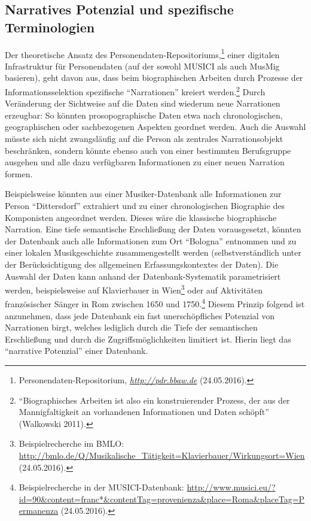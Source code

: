 \documentclass[a4paper,
fontsize=11pt,
oneside,
numbers=noperiodatend,
parskip=half-,
bibliography=totoc,
final
]{scrartcl}
\begin{document}
\subsection*{Narratives Potenzial und spezifische
Terminologien}\label{narratives-potenzial-und-spezifische-terminologien}

Der theoretische Ansatz des Personendaten-Repositoriums,\footnote{Personendaten-Repositorium,
  \href{http://pdr.bbaw.de/}{\emph{http://pdr.bbaw.de}} (24.05.2016).}
einer digitalen Infrastruktur für Personendaten (auf der sowohl MUSICI
als auch MusMig basieren), geht davon aus, dass beim biographischen
Arbeiten durch Prozesse der Informationsselektion spezifische
\enquote{Narrationen} kreiert werden.\footnote{\enquote{Biographisches
  Arbeiten ist also ein konstruierender Prozess, der aus der
  Mannigfaltigkeit an vorhandenen Informationen und Daten schöpft}
  (Walkowski 2011).} Durch Veränderung der Sichtweise auf die Daten sind
wiederum neue Narrationen erzeugbar: So könnten prosopographische Daten
etwa nach chronologischen, geographischen oder sachbezogenen Aspekten
geordnet werden. Auch die Auswahl müsste sich nicht zwangsläufig auf die
Person als zentrales Narrationsobjekt beschränken, sondern könnte ebenso
auch von einer bestimmten Berufsgruppe ausgehen und alle dazu
verfügbaren Informationen zu einer neuen Narration formen.

Beispielsweise könnten aus einer Musiker-Datenbank alle Informationen
zur Person \enquote{Dittersdorf} extrahiert und zu einer chronologischen
Biographie des Komponisten angeordnet werden. Dieses wäre die klassische
biographische Narration. Eine tiefe semantische Erschließung der Daten
vorausgesetzt, könnten der Datenbank auch alle Informationen zum Ort
\enquote{Bologna} entnommen und zu einer lokalen Musikgeschichte
zusammengestellt werden (selbstverständlich unter der Berücksichtigung
des allgemeinen Erfassungskontextes der Daten). Die Auswahl der Daten
kann anhand der Datenbank-Systematik parametrisiert werden,
beispielsweise auf Klavierbauer in Wien\footnote{Beispielrecherche im
  BMLO:
  \url{http://bmlo.de/Q/Musikalische_Tätigkeit=Klavierbauer/Wirkungsort=Wien}
  (24.05.2016).} oder auf Aktivitäten französischer Sänger in Rom
zwischen 1650 und 1750.\footnote{Beispielrecherche in der
  MUSICI-Datenbank:
  \url{http://www.musici.eu/?id=90\&content=franc*\&contentTag=provenienza\&place=Roma\&placeTag=Permanenza}
  (24.05.2016).} Diesem Prinzip folgend ist anzunehmen, dass jede
Datenbank ein fast unerschöpfliches Potenzial von Narrationen birgt,
welches lediglich durch die Tiefe der semantischen Erschließung und
durch die Zugriffsmöglichkeiten limitiert ist. Hierin liegt das
\enquote{narrative Potenzial} einer Datenbank.
\end{document}
